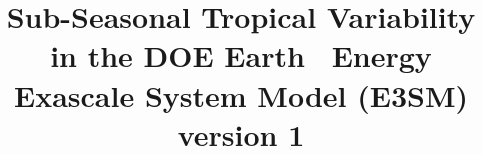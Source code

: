 \documentclass[draft,ms]{AGUTeX}
\begin{document}
%
%
%
%
%
%
%
%
%
%
%





%
%


\title{Sub-Seasonal Tropical Variability in the DOE Earth \ Energy Exascale System Model (E3SM) version 1}
%
%

%
%
\end{document}
